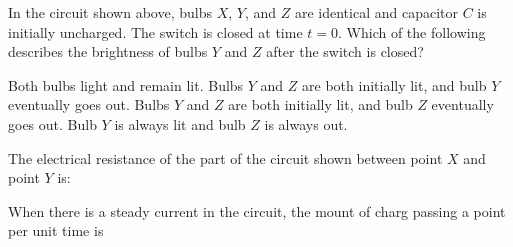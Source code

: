 \documentclass[12pt]{exam}
\newcommand{\pic}[2]{
  \begin{center}
    \texttt{[image: \#2]}
  \end{center}
}
\begin{document}
\begin{questions}
  \uplevel{
    \vspace{-.2in}
    \pic{.25}{rc1}
  }
  \question\vspace{-.2in}In the circuit shown above, bulbs $X$, $Y$, and $Z$
  are identical and capacitor $C$ is initially uncharged. The switch is closed
  at time $t=0$. Which of the following describes the brightness of bulbs $Y$
  and $Z$ after the switch is closed?
  \begin{choices}
    \choice Both bulbs light and remain lit.
    \choice Bulbs $Y$ and $Z$ are both initially lit, and bulb $Y$ eventually
    goes out.
    \choice Bulbs $Y$ and $Z$ are both initially lit, and bulb $Z$ eventually
    goes out.
    \choice Bulb $Y$ is always lit and bulb $Z$ is always out.
  \end{choices}
  \vspace{.6in}

  \question The electrical resistance of the part of the circuit shown between
  point $X$ and point $Y$ is:
  \label{circuit1}

  \question When there is a steady current in the circuit, the mount of
  charg passing a point per unit time is
  \label{circuit2}
  

\end{questions}
\end{document}
